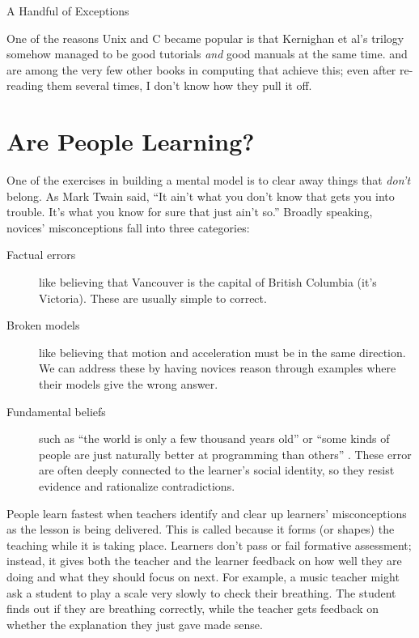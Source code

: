 \begin{aside}{A Handful of Exceptions}

  One of the reasons Unix and C became popular is that
  Kernighan et al's trilogy \cite{Kern1978,Kern1983,Kern1988}
  somehow managed to be good tutorials \emph{and} good manuals at the same time.
  \cite{Fehi2008} and \cite{Ray2014} are among the very few other books in computing that achieve this;
  even after re-reading them several times,
  I don't know how they pull it off.

\end{aside}

\section{Are People Learning?}\label{s:models-formative-assessment}

One of the exercises in building a mental model is to clear away things
that \emph{don't} belong. As Mark Twain said, ``It ain't what you don't know
that gets you into trouble. It's what you know for sure that just ain't
so.'' Broadly speaking, novices' misconceptions fall into three
categories:

\begin{description}

\item[Factual errors]
  like believing that Vancouver is the capital of British Columbia
  (it's Victoria).
  These are usually simple to correct.

\item[Broken models]
  like believing that motion and acceleration must be in the same direction.
  We can address these by having novices reason through examples
  where their models give the wrong answer.

\item[Fundamental beliefs]
  such as ``the world is only a few thousand years old''
  or ``some kinds of people are just naturally better at programming than others''
  \cite{Guzd2015b,Pati2016}.
  These error are often deeply connected to the learner's social identity,
  so they resist evidence and rationalize contradictions.

\end{description}

People learn fastest when teachers identify and clear up learners' misconceptions
as the lesson is being delivered.
This is called 
because it forms (or shapes) the teaching while it is taking place.
Learners don't pass or fail formative assessment;
instead,
it gives both the teacher and the learner feedback on how well they are doing
and what they should focus on next.
For example,
a music teacher might ask a student to play a scale very slowly to check their breathing.
The student finds out if they are breathing correctly,
while the teacher gets feedback on whether the explanation they just gave made sense.

